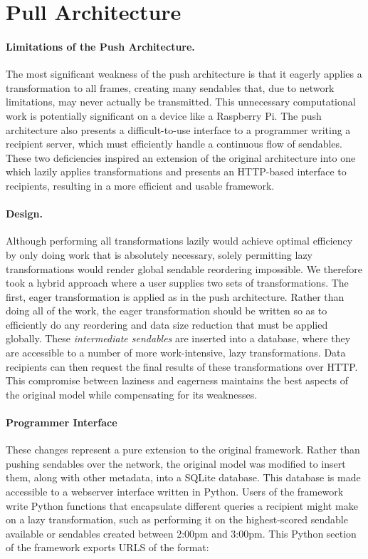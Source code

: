 \section{Pull Architecture}
\label{sec:pull}

\paragraph{Limitations of the Push Architecture.}
The most significant weakness of the push architecture is
that it eagerly applies a transformation to all frames, creating
many sendables that, due to network limitations, may never
actually be transmitted.  This unnecessary computational work is
potentially significant on a device like a Raspberry Pi. The
push architecture also presents a difficult-to-use
interface to a programmer writing a recipient server, which
must efficiently handle a continuous flow of sendables.
These two deficiencies inspired an extension of the original
architecture into one which lazily applies transformations and
presents an HTTP-based interface to recipients, resulting in a
more efficient and usable framework.

\paragraph{Design.}
Although performing all transformations lazily would achieve
optimal efficiency by only doing work that is absolutely necessary,
solely permitting lazy transformations would render global sendable
reordering impossible.  We therefore took a hybrid approach
where a user supplies two sets of transformations.  The first,
eager transformation is applied as in the push architecture.
Rather than doing all of the work, the eager transformation
should be written so as to efficiently do any reordering and
data size reduction that must be applied globally.  These
\emph{intermediate sendables} are inserted into a database, where
they are accessible to a number of more work-intensive, lazy
transformations.  Data recipients can then request the final
results of these transformations over HTTP.  This compromise
between laziness and eagerness maintains the best aspects
of the original model while compensating for its weaknesses.

\paragraph{Programmer Interface}
These changes represent a pure extension to the original framework.
Rather than pushing sendables over the network, the original model
was modified to insert them, along with other metadata, into a SQLite
database.  This database is made accessible to a webserver interface
written in Python.  Users of the framework write Python functions
that encapsulate different queries a recipient might make on a lazy
transformation, such as performing it on the highest-scored sendable
available or sendables created between 2:00pm and 3:00pm.  This
Python section of the framework exports URLS of the format:

